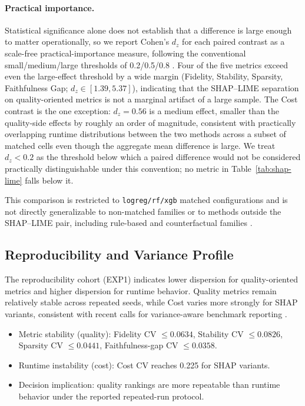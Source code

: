 \documentclass[twoside,11pt]{article}
\begin{document}
\paragraph{Practical importance.} Statistical significance alone does not
establish that a difference is large enough to matter operationally, so we
report Cohen's $d_z$ for each paired contrast as a scale-free practical-importance
measure, following the conventional small/medium/large thresholds of
0.2/0.5/0.8 \citep{cohen1988statistical}. Four of the five metrics exceed even
the large-effect threshold by a wide margin (Fidelity, Stability, Sparsity,
Faithfulness Gap; $d_z \in [1.39, 5.37]$), indicating that the SHAP--LIME
separation on quality-oriented metrics is not a marginal artifact of a large
sample. The Cost contrast is the one exception: $d_z=0.56$ is a medium effect,
smaller than the quality-side effects by roughly an order of magnitude,
consistent with practically overlapping runtime distributions between the two
methods across a subset of matched cells even though the aggregate mean
difference is large. We treat $d_z<0.2$ as the threshold below which a paired
difference would not be considered practically distinguishable under this
convention; no metric in Table~\ref{tab:shap-lime} falls below it.

This comparison is restricted to \texttt{logreg/rf/xgb} matched configurations
and is not directly generalizable to non-matched families or to methods outside
the SHAP--LIME pair, including rule-based and counterfactual families
\citep{ribeiro2018anchors,mothilal2020dice}.

\subsection{Reproducibility and Variance Profile}
The reproducibility cohort (EXP1) indicates lower dispersion for quality-oriented
metrics and higher dispersion for runtime behavior. Quality metrics remain
relatively stable across repeated seeds, while Cost varies more strongly for
SHAP variants, consistent with recent calls for variance-aware benchmark
reporting \citep{agarwal2022openxai,hedstrom2023quantus}.
\begin{itemize}[leftmargin=*]
    \item Metric stability (quality): Fidelity CV $\leq 0.0634$, Stability CV $\leq 0.0826$, Sparsity CV $\leq 0.0441$, Faithfulness-gap CV $\leq 0.0358$.
    \item Runtime instability (cost): Cost CV reaches 0.225 for SHAP variants.
    \item Decision implication: quality rankings are more repeatable than runtime behavior under the reported repeated-run protocol.
\end{itemize}
\end{document}
